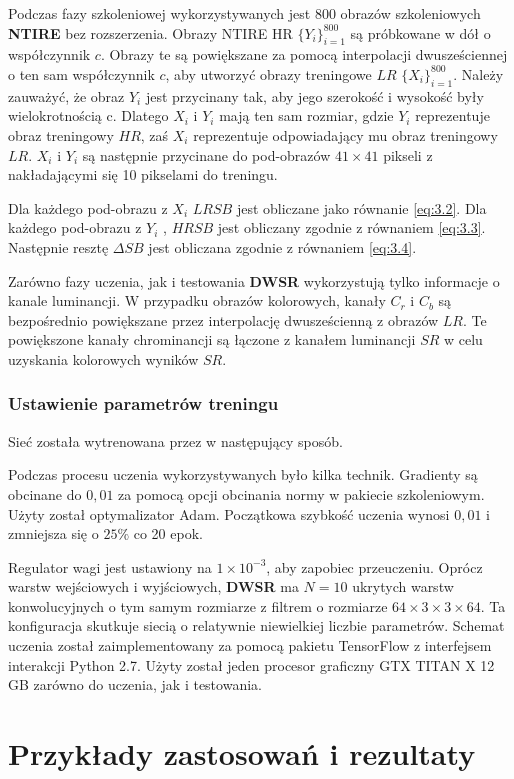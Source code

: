 Podczas fazy szkoleniowej wykorzystywanych jest $800$ obrazów szkoleniowych \textbf{NTIRE} \cite{8014883} bez rozszerzenia. Obrazy NTIRE HR 
$\{Y_i\}^{800}_{i=1}$ są próbkowane w dół o współczynnik $c$. 
Obrazy te są powiększane za pomocą interpolacji dwusześciennej o ten sam współczynnik $c$, aby utworzyć obrazy treningowe $LR$ 
$\{X_i\}^{800}_{i=1}$. Należy zauważyć, że obraz $Y_i$ jest przycinany tak, aby jego szerokość i wysokość były wielokrotnością c. Dlatego $X_i$ i $Y_i$ mają ten sam rozmiar, gdzie $Y_i$ reprezentuje obraz treningowy $HR$, zaś $X_i$ reprezentuje odpowiadający mu obraz treningowy $LR$. $X_i$ i $Y_i$ są następnie przycinane do pod-obrazów $41 \times  41$ pikseli z nakładającymi się 10 pikselami do treningu.

Dla każdego pod-obrazu z $X_i$ $LRSB$ jest obliczane jako równanie \ref{eq:3.2}. Dla każdego pod-obrazu z $Y_i$ , $HRSB$ jest obliczany zgodnie z równaniem \ref{eq:3.3}. Następnie resztę $\Delta SB$ jest obliczana zgodnie z równaniem \ref{eq:3.4}.

Zarówno fazy uczenia, jak i testowania \textbf{DWSR} \cite{guo2017deep} wykorzystują tylko informacje o kanale luminancji. W przypadku obrazów kolorowych, kanały $C_r$ i $C_b$ są bezpośrednio powiększane przez interpolację dwusześcienną z obrazów $LR$. Te powiększone kanały chrominancji są łączone z kanałem luminancji $SR$ w celu uzyskania kolorowych wyników $SR$.


\subsubsection*{Ustawienie parametrów treningu}

Sieć została wytrenowana przez \cite{guo2017deep} w następujący sposób.

Podczas procesu uczenia wykorzystywanych było kilka technik. Gradienty są obcinane do $0,01$ za pomocą opcji obcinania normy w pakiecie szkoleniowym. Użyty został optymalizator Adam. Początkowa szybkość uczenia wynosi $0,01$ i zmniejsza się o $25\%$ co 20 epok. 

Regulator wagi jest ustawiony na $1 \times 10^{-3}$, aby zapobiec przeuczeniu. Oprócz warstw wejściowych i wyjściowych, \textbf{DWSR} ma $N = 10$ ukrytych warstw konwolucyjnych o tym samym rozmiarze z filtrem o rozmiarze $64 \times 3 \times 3 \times 64$. Ta konfiguracja skutkuje siecią o relatywnie niewielkiej liczbie parametrów. Schemat uczenia został zaimplementowany za pomocą pakietu TensorFlow z interfejsem interakcji Python 2.7. Użyty został jeden procesor graficzny GTX TITAN X 12 GB zarówno do uczenia, jak i testowania.


\section{Przykłady zastosowań i rezultaty}



\